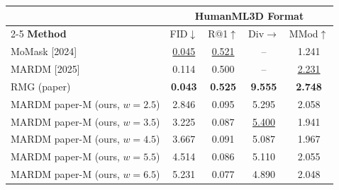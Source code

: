 \begin{tabular}{l|cccc}
\hline\hline
 & \multicolumn{4}{c}{\textbf{HumanML3D Format}} \\
\cline{2-5}
\textbf{Method} & FID$\downarrow$ & R@1$\uparrow$ & Div$\rightarrow$ & MMod$\uparrow$ \\
\hline
MoMask [2024] & \underline{0.045} & \underline{0.521} & -- & 1.241 \\
MARDM [2025] & 0.114 & 0.500 & -- & \underline{2.231} \\
RMG (paper) & \textbf{0.043} & \textbf{0.525} & \textbf{9.555} & \textbf{2.748} \\
\hline
MARDM paper-M (ours, $w=2.5$) & 2.846 & 0.095 & 5.295 & 2.058 \\
MARDM paper-M (ours, $w=3.5$) & 3.225 & 0.087 & \underline{5.400} & 1.941 \\
MARDM paper-M (ours, $w=4.5$) & 3.667 & 0.091 & 5.087 & 1.967 \\
MARDM paper-M (ours, $w=5.5$) & 4.514 & 0.086 & 5.110 & 2.055 \\
MARDM paper-M (ours, $w=6.5$) & 5.231 & 0.077 & 4.890 & 2.048 \\
\hline\hline
\end{tabular}
